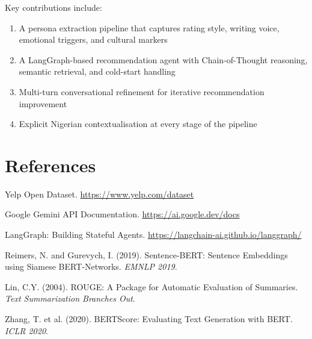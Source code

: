 \documentclass[11pt, a4paper]{article}
\begin{document}
Key contributions include:
\begin{enumerate}[leftmargin=2em]
    \item A persona extraction pipeline that captures rating style, writing voice, emotional triggers, and cultural markers
    \item A LangGraph-based recommendation agent with Chain-of-Thought reasoning, semantic retrieval, and cold-start handling
    \item Multi-turn conversational refinement for iterative recommendation improvement
    \item Explicit Nigerian contextualisation at every stage of the pipeline
\end{enumerate}

\section*{References}
\begin{enumerate}[leftmargin=2em, label={[\arabic*]}]
    \item Yelp Open Dataset. \url{https://www.yelp.com/dataset}
    \item Google Gemini API Documentation. \url{https://ai.google.dev/docs}
    \item LangGraph: Building Stateful Agents. \url{https://langchain-ai.github.io/langgraph/}
    \item Reimers, N. and Gurevych, I. (2019). Sentence-BERT: Sentence Embeddings using Siamese BERT-Networks. \textit{EMNLP 2019}.
    \item Lin, C.Y. (2004). ROUGE: A Package for Automatic Evaluation of Summaries. \textit{Text Summarization Branches Out}.
    \item Zhang, T. et al. (2020). BERTScore: Evaluating Text Generation with BERT. \textit{ICLR 2020}.
\end{enumerate}
\end{document}
